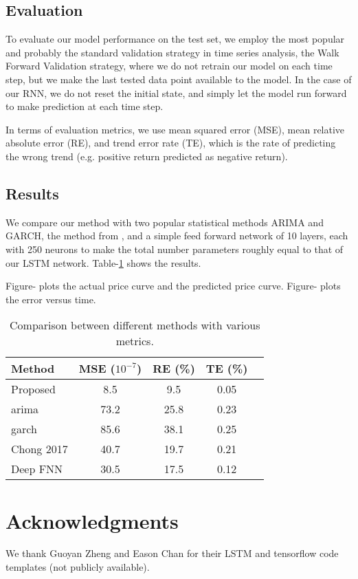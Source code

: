 \documentclass{article}
\begin{document}
\subsection{Evaluation}
To evaluate our model performance on the test set, we employ the most popular and probably the standard validation strategy in time series analysis, the Walk Forward Validation strategy, where we do not retrain our model on each time step, but we make the last tested data point available to the model. In the case of our RNN, we do not reset the initial state, and simply let the model run forward to make prediction at each time step.

In terms of evaluation metrics, we use mean squared error (MSE), mean relative absolute error (RE), and trend error rate (TE), which is the rate of predicting the wrong trend (e.g. positive return predicted as negative return).

\subsection{Results}
We compare our method with two popular statistical methods ARIMA and GARCH, the method from \cite{Chong2017}, and a simple feed forward network of 10 layers, each with 250 neurons to make the total number parameters roughly equal to that of our LSTM network. Table-\ref{comparison-table} shows the results.

Figure- plots the actual price curve and the predicted price curve. Figure- plots the error versus time.

\begin{table}[t]
\caption{Comparison between different methods with various metrics.}
\label{comparison-table}
\vskip 0.15in
\begin{center}
\begin{small}
\begin{sc}
\begin{tabular}{lcccr}
\hline
\abovespace\belowspace
Method & MSE ($10^{-7}$) & RE (\%) & TE (\%) \\
\hline
\abovespace
Proposed   & 8.5& 9.5& 0.05  \\
arima      & 73.2& 25.8& 0.23 \\
garch      & 85.6& 38.1& 0.25  \\
Chong 2017 & 40.7& 19.7& 0.21     \\
\belowspace
Deep FNN   & 30.5& 17.5& 0.12 \\
\hline
\end{tabular}
\end{sc}
\end{small}
\end{center}
\vskip -0.1in
\end{table}

\section*{Acknowledgments} 
We thank Guoyan Zheng and Eason Chan for their LSTM and tensorflow code templates (not publicly available).



\end{document}
